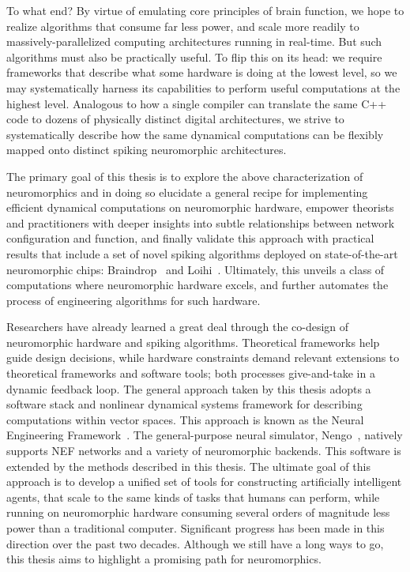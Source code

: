 To what end?
By virtue of emulating core principles of brain function, we hope to realize algorithms that consume far less power, and scale more readily to massively-parallelized computing architectures running in real-time.
But such algorithms must also be practically useful.
To flip this on its head: we require frameworks that describe what some hardware is doing at the lowest level,
so we may systematically harness its capabilities to perform useful computations at the highest level.
Analogous to how a single compiler can translate the same C++ code
to dozens of physically distinct digital architectures, we strive to systematically describe
how the same dynamical computations can be flexibly mapped onto distinct spiking neuromorphic architectures.

The primary goal of this thesis is to explore the above characterization of neuromorphics and in doing so elucidate a general recipe for implementing efficient dynamical computations on neuromorphic hardware, empower theorists and practitioners with deeper insights into subtle relationships between network configuration and function, and finally validate this approach with practical results that include a set of novel spiking algorithms deployed on state-of-the-art neuromorphic chips: Braindrop~\citep{braindrop2019} and Loihi~\citep{davies2018loihi}.
Ultimately, this unveils a class of computations where neuromorphic hardware excels, and further automates the process of engineering algorithms for such hardware.

Researchers have already learned a great deal through the co-design of neuromorphic hardware and spiking algorithms.
Theoretical frameworks help guide design decisions, while hardware constraints demand relevant extensions to theoretical frameworks and software tools; both processes give-and-take in a dynamic feedback loop.
The general approach taken by this thesis adopts a software stack and nonlinear dynamical systems framework
for describing computations within vector spaces.
This approach is known as the Neural Engineering Framework~\citep[NEF;][]{eliasmith2003a}.
The general-purpose neural simulator, Nengo~\citep{bekolay2014}, natively supports NEF networks and a variety of neuromorphic backends.
This software is extended by the methods described in this thesis.
The ultimate goal of this approach is to develop a unified set of tools for constructing
artificially intelligent agents, that scale to the same kinds of tasks that
humans can perform, while running on neuromorphic hardware consuming several orders of magnitude less power than a traditional computer.
Significant progress has been made in this direction over the past two decades.
Although we still have a long ways to go, this thesis aims to highlight a promising path for neuromorphics.

